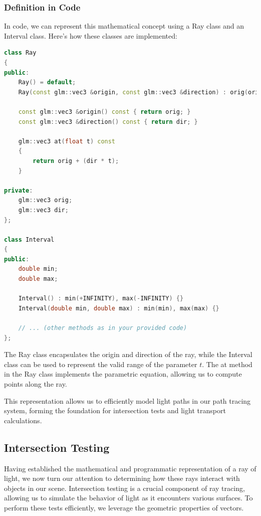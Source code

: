 \documentclass[12pt]{article}
\begin{document}
\subsubsection{Definition in Code}

In code, we can represent this mathematical concept using a Ray class and an Interval class. Here's how these classes are implemented:

\begin{lstlisting}[language=C++]
class Ray
{
public:
    Ray() = default;
    Ray(const glm::vec3 &origin, const glm::vec3 &direction) : orig(origin), dir(direction) {}

    const glm::vec3 &origin() const { return orig; }
    const glm::vec3 &direction() const { return dir; }

    glm::vec3 at(float t) const
    {
        return orig + (dir * t);
    }

private:
    glm::vec3 orig;
    glm::vec3 dir;
};

class Interval
{
public:
    double min;
    double max;

    Interval() : min(+INFINITY), max(-INFINITY) {}
    Interval(double min, double max) : min(min), max(max) {}

    // ... (other methods as in your provided code)
};
\end{lstlisting}

The Ray class encapsulates the origin and direction of the ray, while the Interval class can be used to represent the valid range of the parameter \(t\). The at method in the Ray class implements the parametric equation, allowing us to compute points along the ray.

This representation allows us to efficiently model light paths in our path tracing system, forming the foundation for intersection tests and light transport calculations.

\subsection{Intersection Testing}

Having established the mathematical and programmatic representation of a ray of light, we now turn our attention to determining how these rays interact with objects in our scene. Intersection testing is a crucial component of ray tracing, allowing us to simulate the behavior of light as it encounters various surfaces. To perform these tests efficiently, we leverage the geometric properties of vectors.
\end{document}
